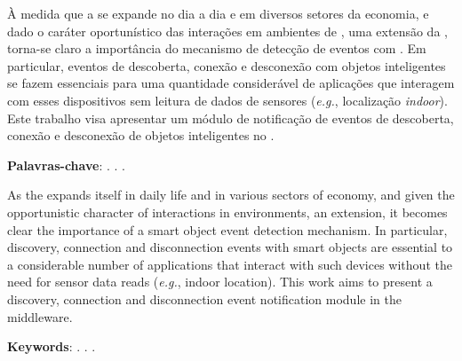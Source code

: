 \setlength{\absparsep}{18pt} %
\begin{resumo}
	À medida que a \iot se expande no dia a dia e em diversos setores da economia, e dado o caráter oportunístico das interações em ambientes de \iomt, uma extensão da \iot, torna-se claro a importância do mecanismo de detecção de eventos com \smartobjs.
	Em particular, eventos de descoberta, conexão e desconexão com objetos inteligentes se fazem essenciais para uma quantidade considerável de aplicações que interagem com esses dispositivos sem leitura de dados de sensores (\textit{e.g.}, localização \textit{indoor}).
	Este trabalho visa apresentar um módulo de notificação de eventos de descoberta, conexão e desconexão de objetos inteligentes no \middleware \mhubcddl.

	\textbf{Palavras-chave}: \iot. \iomt. \Middleware.
\end{resumo}

\begin{resumo}[Abstract]
	As the \iot expands itself in daily life and in various sectors of economy, and given the opportunistic character of interactions in \iomt environments, an \iot extension, it becomes clear the importance of a smart object event detection mechanism.
	In particular, discovery, connection and disconnection events with smart objects are essential to a considerable number of applications that interact with such devices without the need for sensor data reads (\textit{e.g.}, indoor location).
	This work aims to present a discovery, connection and disconnection event notification module in the \mhubcddl middleware.

	\textbf{Keywords}: \iot. \iomt. \Middleware.
\end{resumo}
